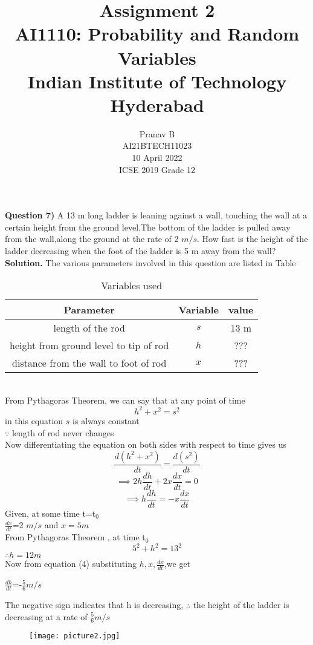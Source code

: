 \documentclass[journal,12pt,twocolumn]{IEEEtran}
\title{Assignment 2 \\ \Large AI1110: Probability and Random Variables \\ \large Indian Institute of Technology Hyderabad}
\author{Pranav B \\ \normalsize AI21BTECH11023 \\ \vspace*{20pt} \normalsize  10 April 2022 \\ \vspace*{20pt} \Large ICSE 2019 Grade 12}
\begin{document}
	\maketitle
	
	\textbf{Question 7)} 
	A 13 m long ladder is leaning against a wall, touching the wall at a certain height from the ground level.The bottom of the ladder is pulled away from the wall,along the ground at the rate of 2 $m/s$. How fast is the height of the ladder decreasing when the foot of the ladder is 5 m away from the wall?\\
	\textbf{Solution.}
	The various parameters involved in this question are listed in Table \begin{table}[h]
\caption{Variables used}
\begin{tabular}{|c|c|c|}
\hline
Parameter & Variable & value\\
\hline
length of the rod & $s$ & 13 m\\
\hline
height from ground level to tip of rod & $h$ & ???\\
\hline
distance from the wall to foot of rod & $x$ &???\\
\hline
\end{tabular}
\end{table}
\\
From Pythagoras Theorem, we can say that at any point of time\\
\begin{equation}
h^2+x^2=s^2
\end{equation}
in this equation $s$ is always constant\\
 $\because$ length of rod never changes\\
 Now differentiating the equation on both sides with respect to time gives us\\
 \begin{equation}
 \frac{d(h^2+x^2)}{dt}=\frac{d(s^2)}{dt}
 \end{equation}
 \begin{equation}
  \implies 2h\frac{dh}{dt}+2x\frac{dx}{dt}=0
 \end{equation}
 \begin{equation}
 \implies h\frac{dh}{dt}=-x\frac{dx}{dt}
 \end{equation}
 Given, at some time t=t$_0$\\
  $\frac{dx}{dt}$=2 $m/s$ and $x= 5 m$\\
  From Pythagoras Theorem , at time t$_0$
  \begin{equation}
  5^2+h^2=13^2
  \end{equation}
  $\therefore h= 12 m$\\
  Now from equation (4) substituting $h,x,\frac{dx}{dt}$,we get\\
  \begin{center}
   $\frac{dh}{dt}$=-$\frac{5}{6} m/s$
\end{center}  
The negative sign indicates that h is decreasing,
$\therefore$ the height of the ladder is decreasing at a rate of $\frac{5}{6} m/s$
\begin{figure}[h]
\texttt{[image: picture2.jpg]}

\end{figure}
\end{document}
